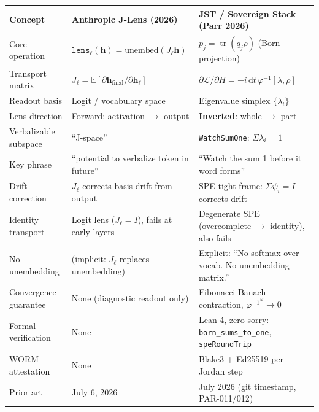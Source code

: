\documentclass[12pt, letterpaper]{article}
\theoremstyle{plain}
\theoremstyle{definition}
\theoremstyle{remark}
\newcommand{\phiinv}{\varphi^{-1}}
\begin{document}
\begin{center}
\small
\renewcommand{\arraystretch}{1.5}
\begin{tabular}{@{}p{3.8cm}p{5cm}p{5cm}@{}}
\toprule
\textbf{Concept} & \textbf{Anthropic J-Lens (2026)} & \textbf{JST / Sovereign Stack (Parr 2026)} \\
\midrule
Core operation &
  $\texttt{lens}_\ell(\mathbf{h}) = \text{unembed}(J_\ell \mathbf{h})$ &
  $p_j = \operatorname{tr}(q_j \rho)$ (Born projection) \\

Transport matrix &
  $J_\ell = \mathbb{E}[\partial\mathbf{h}_\text{final}/\partial\mathbf{h}_\ell]$ &
  $\partial\mathcal{L}/\partial H = -i\,\mathrm{d}t\,\phiinv[\lambda,\rho]$ \\

Readout basis &
  Logit / vocabulary space &
  Eigenvalue simplex $\{\lambda_i\}$ \\

Lens direction &
  Forward: activation $\to$ output &
  \textbf{Inverted}: whole $\to$ part \\

Verbalizable subspace &
  ``J-space'' &
  \texttt{WatchSumOne}: $\Sigma\lambda_i = 1$ \\

Key phrase &
  ``potential to verbalize token in future'' &
  ``Watch the sum 1 before it word forms'' \\

Drift correction &
  $J_\ell$ corrects basis drift from output &
  SPE tight-frame: $\Sigma\psi_i = I$ corrects drift \\

Identity transport &
  Logit lens ($J_\ell = I$), fails at early layers &
  Degenerate SPE (overcomplete $\to$ identity), also fails \\

No unembedding &
  (implicit: $J_\ell$ replaces unembedding) &
  Explicit: ``No softmax over vocab. No unembedding matrix.'' \\

Convergence guarantee &
  None (diagnostic readout only) &
  Fibonacci-Banach contraction, $\phiinv^N \to 0$ \\

Formal verification &
  None &
  Lean 4, zero sorry: \texttt{born\_sums\_to\_one}, \texttt{speRoundTrip} \\

WORM attestation &
  None &
  Blake3 + Ed25519 per Jordan step \\

Prior art &
  July 6, 2026 &
  July 2026 (git timestamp, PAR-011/012) \\
\bottomrule
\end{tabular}
\end{center}
\end{document}

